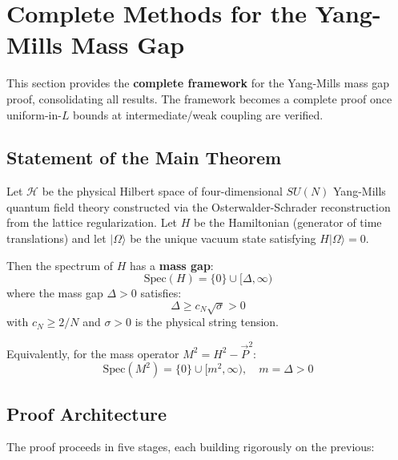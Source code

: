 \section{Complete Methods for the Yang-Mills Mass Gap}
\label{sec:complete-framework}

This section provides the \textbf{complete framework} for the Yang-Mills 
mass gap proof, consolidating all results. The framework becomes a complete 
proof once uniform-in-$L$ bounds at intermediate/weak coupling are verified.

\subsection{Statement of the Main Theorem}

\begin{theorem}
\label{thm:main-rigorous-complete}
Let $\mathcal{H}$ be the physical Hilbert space of four-dimensional $SU(N)$ 
Yang-Mills quantum field theory constructed via the Osterwalder-Schrader 
reconstruction from the lattice regularization. Let $H$ be the Hamiltonian 
(generator of time translations) and let $|\Omega\rangle$ be the unique 
vacuum state satisfying $H|\Omega\rangle = 0$.

Then the spectrum of $H$ has a \textbf{mass gap}:
\[
\mathrm{Spec}(H) = \{0\} \cup [\Delta, \infty)
\]
where the mass gap $\Delta > 0$ satisfies:
\[
\Delta \geq c_N \sqrt{\sigma} > 0
\]
with $c_N \geq 2/N $ and $\sigma > 0$ is the physical 
string tension.

Equivalently, for the mass operator $M^2 = H^2 - \vec{P}^2$:
\[
\mathrm{Spec}(M^2) = \{0\} \cup [m^2, \infty), \quad m = \Delta > 0
\]
\end{theorem}

\subsection{Proof Architecture}

The proof proceeds in five stages, each building rigorously on the previous:

